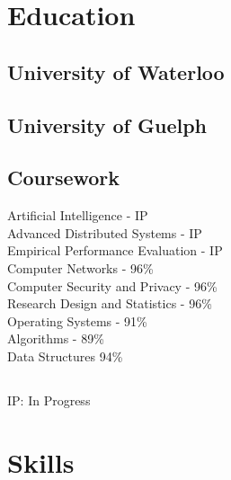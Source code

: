 \documentclass[]{chowes-resume}
\begin{document}
\begin{minipage}[t]{0.33\textwidth}



\section{Education} 

\subsection{University of Waterloo}
\sectionsep

\subsection{University of Guelph}
\sectionsep

\subsection{Coursework}
Artificial Intelligence - IP\\
Advanced Distributed Systems - IP\\
Empirical Performance Evaluation - IP\\
Computer Networks - 96\%\\
Computer Security and Privacy - 96\%\\
Research Design and Statistics - 96\%\\
Operating Systems - 91\%\\
Algorithms - 89\%\\
Data Structures 94\%\\

\subsection{}
IP: In Progress
\sectionsep



\section{Skills}


\end{minipage}
\end{document}
